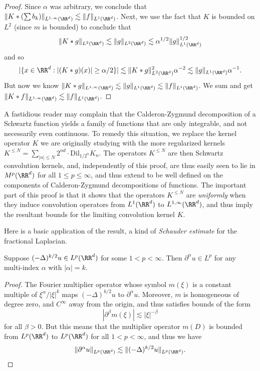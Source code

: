 \begin{proof}
  Since $\alpha$ was arbitrary, we conclude that $\| K * (\sum b_k) \|_{L^{1,\infty}(\RR^d)} \lesssim \| f \|_{L^1(\RR^d)}$. Next, we use the fact that $K$ is bounded on $L^2$ (since $m$ is bounded) to conclude that
  \[ \| K * g \|_{L^2(\RR^d)} \lesssim \| g \|_{L^2(\RR^d)} \lesssim \alpha^{1/2} \| g \|_{L^1(\RR^d)}^{1/2} \]
  and so
  \[ |\{ x \in \RR^d: |(K * g)(x)| \geq \alpha / 2 \}| \lesssim \| K * g \|_{L^2(\RR^d)}^2 \alpha^{-2} \lesssim \| g \|_{L^1(\RR^d)} \alpha^{-1}. \]
  But now we know $\| K * g \|_{L^{1,\infty}(\RR^d)} \lesssim \| g \|_{L^1(\RR^d)} \lesssim \| f \|_{L^1(\RR^d)}$. We sum and get $\| K * f \|_{L^{1,\infty}(\RR^d)} \lesssim \| f \|_{L^1(\RR^d)}$.
\end{proof}

\begin{remark}
    A fastidious reader may complain that the Calderon-Zygmund decomposition of a Schwartz function yields a family of functions that are only integrable, and not necessarily even continuous. To remedy this situation, we replace the kernel operator $K$ we are originally studying with the more regularized kernels $K^{\leq N} = \sum_{|n| \leq N} 2^{nd} \cdot \text{Dil}_{1/2^n} K_n$. The operators $K^{\leq N}$ are then Schwartz convolution kernels, and, independently of this proof, are thus easily seen to lie in $M^p(\RR^d)$ for all $1 \leq p \leq \infty$, and thus extend to be well defined on the components of Calderon-Zygmund decompositions of functions. The important part of this proof is that it shows that the operators $K^{\leq N}$ are \emph{uniformly} when they induce convolution operators from $L^1(\RR^d)$ to $L^{1,\infty}(\RR^d)$, and thus imply the resultant bounds for the limiting convolution kernel $K$.
\end{remark}

Here is a basic application of the result, a kind of \emph{Schauder estimate} for the fractional Laplacian.

\begin{theorem}
    Suppose $(- \Delta)^{k/2} u \in L^p(\RR^d)$ for some $1 < p < \infty$. Then $\partial^\alpha u \in L^p$ for any multi-index $\alpha$ with $|\alpha| = k$.
\end{theorem}
\begin{proof}
    The Fourier multiplier operator whose symbol $m(\xi)$ is a constant multiple of $\xi^\alpha / |\xi|^k$ maps $(-\Delta)^{k/2} u$ to $\partial^\alpha u$. Moreover, $m$ is homogeneous of degree zero, and $C^\infty$ away from the origin, and thus satisfies bounds of the form
    \[ |\partial^\beta m(\xi)| \lesssim |\xi|^{-\beta} \]
    for all $\beta > 0$. But this means that the multiplier operator $m(D)$ is bounded from $L^p(\RR^d)$ to $L^p(\RR^d)$ for all $1 < p < \infty$, and thus we have
    \[ \| \partial^\alpha u \|_{L^p(\RR^d)} \lesssim \| (-\Delta)^{k/2} u \|_{L^p(\RR^d)}. \qedhere \]
\end{proof}

